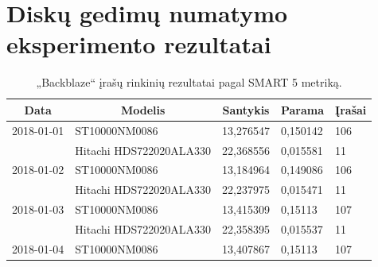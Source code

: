 \documentclass{VUMIFPSkursinis}
\begin{document}
\section{Diskų gedimų numatymo eksperimento rezultatai} \label{sec:rez}
\begin{table}[H]
\centering
\caption{„Backblaze“ įrašų rinkinių rezultatai pagal SMART 5 metriką.}
\label{tab:rez5}
{\begin{tabular}{|c|l|l|l|l|}
\hline
\textbf{Data}                                   & \multicolumn{1}{c|}{\textbf{Modelis}} & \multicolumn{1}{c|}{\textbf{Santykis}} & \multicolumn{1}{c|}{\textbf{Parama}} & \multicolumn{1}{c|}{\textbf{Įrašai}} \\ \hline
2018-01-01                                      & ST10000NM0086                         & 13,276547                              & 0,150142                             & 106                                  \\ \hline
\cellcolor[HTML]{C0C0C0}{\color[HTML]{333333} } & Hitachi HDS722020ALA330               & 22,368556                              & 0,015581                             & 11                                   \\ \hline
2018-01-02                                      & ST10000NM0086                         & 13,184964                              & 0,149086                             & 106                                  \\ \hline
\cellcolor[HTML]{C0C0C0}                        & Hitachi HDS722020ALA330               & 22,237975                              & 0,015471                             & 11                                   \\ \hline
2018-01-03                                      & ST10000NM0086                         & 13,415309                              & 0,15113                              & 107                                  \\ \hline
\cellcolor[HTML]{C0C0C0}                        & Hitachi HDS722020ALA330               & 22,358395                              & 0,015537                             & 11                                   \\ \hline
2018-01-04                                      & ST10000NM0086                         & 13,407867                              & 0,15113                              & 107                                  \\ \hline

\end{tabular}}
\end{table}
\end{document}

